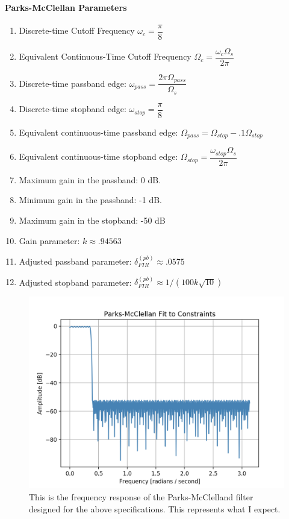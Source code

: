 \documentclass{article}
\begin{document}
\paragraph{Parks-McClellan Parameters}
\begin{enumerate}
    \item Discrete-time Cutoff Frequency $\omega_c = \dfrac{\pi}{8}$
    \item Equivalent Continuous-Time Cutoff Frequency $\Omega_c = \dfrac{\omega_c\Omega_s}{2\pi}$
    \item Discrete-time passband edge: $\omega_{pass} =  \dfrac{2\pi\Omega_{pass}}{\Omega_s} $
    \item Discrete-time stopband edge: $\omega_{stop} = \dfrac{\pi}{8}$
    \item Equivalent continuous-time passband edge: $\Omega_{pass} = \Omega_{stop} - .1\Omega_{stop}$
    \item Equivalent continuous-time stopband edge: $\Omega_{stop} = \dfrac{\omega_{stop}\Omega_s}{2\pi}$
    \item Maximum gain in the passband: 0 dB.
    \item Minimum gain in the passband: -1 dB.
    \item Maximum gain in the stopband: -50 dB
    \item Gain parameter: $k \approx .94563 $
    \item Adjusted passband parameter: $\delta^{(pb)}_{FIR} \approx .0575$
    \item Adjusted stopband parameter: $\delta^{(pb)}_{FIR} \approx 1/(100k\sqrt{10})$
\end{enumerate}

\begin{figure}[h] \label{fig:parks_1}
    \centering
    \includegraphics[width=.5\textwidth]{given_1_parks_1.png}
    \caption{This is the frequency response of the Parks-McClelland filter designed for the above specifications. This represents what I expect.}
\end{figure}
\end{document}
